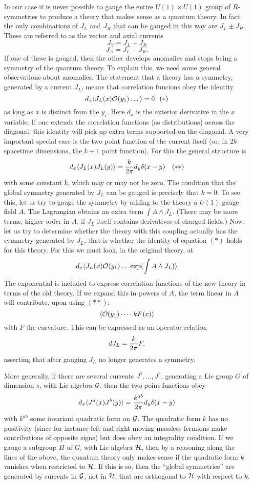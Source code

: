 In our case it is never possible to gauge the entire
$U(1)\times U(1)$ group of $R$-symmetries to produce a theory that
makes sense as a quantum theory.
In fact the only 
combinations of $J_L$ and $J_R$ that can be gauged in this way are
$J_L\pm J_R$.
These are referred to as the vector and axial currents  
$$J_V=J_L+J_R$$
$$J_A=J_L-J_R.$$
If one of these is gauged, then the other develops anomalies
and stops being a symmetry of the quantum theory.
To explain this, we need some general observations about anomalies.
The statement that a theory has a symmetry, generated by a current
$J_L$, means that correlation funcions obey the identity
$$d_x\langle J_L(x){\cal O}(y_1)\dots\rangle =0  ~~(*)$$
as long as $x$ is distinct from the $y_i$.  
Here $d_x$ is the exterior derivative in the $x$ variable.
If one extends the correlation functions (as distributions) across
the diagonal, this identity will pick up extra terms supported
on the diagonal.  A very important special case is the two point function
of the current itself (or, in $2k$ spacetime dimensions, the $k+1$ point
function).   For this the general structure is 
$$d_x\langle J_L(x)J_L(y)\rangle ={k\over 2 \pi }d_y\delta(x-y)~~~ (**)$$
with some constant $k$, which may or may not be zero.  The condition
that the global symmetry generated by $J_L$ can be gauged is precisely
that $k=0$.  To see this, let us try to gauge the symmetry by adding
to the theory a $U(1)$ gauge field $A$.  The Lagrangian obtains an extra
term $\int A\wedge J_L$.  (There may be more terms, higher order in $A$,
if $J_L$ itself contains derivatives of charged fields.)
Now, let us try to determine whether the theory with this coupling
actually has the symmetry generated by $J_L$, that is whether
the identity of equation $(*)$ holds for this theory.
For this we must look, in the original theory, at
$$d_x\langle J_L(x){\cal O}(y_1)\dots\exp(\int A\wedge J_L)\rangle $$
The exponential is included to express correlation functions of the
new theory in terms of the old theory.  If we expand this in powers
of $A$, the term linear in $A$ will contribute, upon using $(**)$:
$$\langle {\cal O}(y_1)\dots \cdot kF(x)\rangle $$
with $F$ the curvature.
This can be expressed as an operator relation
$$ dJ_L={k\over 2\pi}F,$$
asserting that after gauging $J_L$ no longer generates a symmetry.

More generally, if there are several currents $J^1,\dots, J^s$, generating
a Lie group $G$ of dimension $s$, with Lie algebra ${\cal G}$,
then the two point functions obey
$$d_x\langle J^a(x)J^b(y)\rangle ={k^{ab}\over 2\pi}d_y\delta(x-y)$$
with $k^{ab}$ some invariant quadratic form on ${\cal G}$.
The quadratic form $k$ has no positivity (since for instance
left and right moving
massless fermions make contributions of opposite signs) but does
obey an integrality condition.
If we gauge a subgroup $H$ of $G$, with Lie algebra ${\cal H}$,
then by a reasoning along the lines of the above, the quantum theory
only makes sense if the quadratic form $k$ vanishes when restricted to
${\cal H}$.  If this is so, then the ``global symmetries'' are generated
by currents in ${\cal G}$, not in ${\cal H}$, that are orthogonal
to ${\cal H}$ with respect to $k$.

